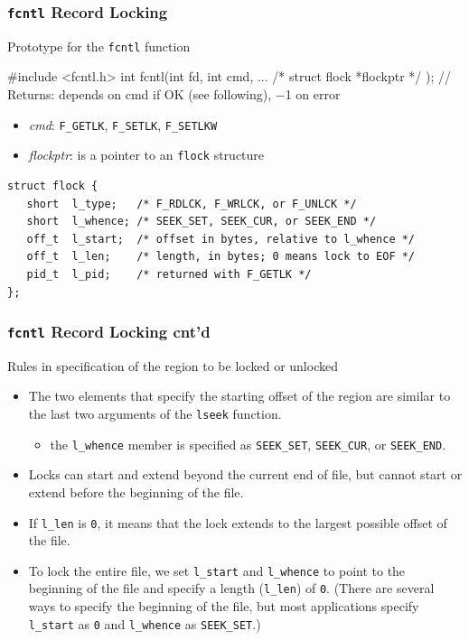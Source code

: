 \documentclass[newPxFont,sthlmFooter,nooffset]{beamer}
\begin{document}
\begin{frame}[fragile,t]
  \frametitle{\texttt{fcntl} Record Locking}

Prototype for the \texttt{fcntl} function
\begin{codedef}
#include <fcntl.h>
int fcntl(int fd, int cmd, ... /* struct flock *flockptr */ );
// Returns: depends on cmd if OK (see following), −1 on error
\end{codedef}

\begin{itemize}
\item \textit{cmd}: \texttt{F\_GETLK}, \texttt{F\_SETLK}, \texttt{F\_SETLKW}
\item \textit{flockptr}: is a pointer to an \texttt{flock} structure
\end{itemize}

{\footnotesize
\begin{verbatim}
struct flock {
   short  l_type;   /* F_RDLCK, F_WRLCK, or F_UNLCK */
   short  l_whence; /* SEEK_SET, SEEK_CUR, or SEEK_END */
   off_t  l_start;  /* offset in bytes, relative to l_whence */
   off_t  l_len;    /* length, in bytes; 0 means lock to EOF */
   pid_t  l_pid;    /* returned with F_GETLK */
};
\end{verbatim}
}
\end{frame}

\begin{frame}[t]
  \frametitle{\texttt{fcntl} Record Locking cnt'd}
Rules in specification of the region to be locked or unlocked
\begin{itemize}
\item The two elements that specify the starting offset of the region are similar to the last two arguments of the \texttt{lseek} function.
  \begin{itemize}
  \item the \texttt{l\_whence} member is specified as
    \texttt{SEEK\_SET}, \texttt{SEEK\_CUR}, or \texttt{SEEK\_END}.
  \end{itemize}

\item  Locks can start and extend beyond the current end of file, but cannot start or extend before the beginning of the file.
\item  If \texttt{l\_len} is \texttt{0}, it means that the lock extends to the largest possible offset of the file.
\item To lock the entire file, we set \texttt{l\_start} and \texttt{l\_whence} to point to the beginning of the file and specify a length (\texttt{l\_len}) of \texttt{0}. {\footnotesize (There are several ways to specify the beginning of the file, but most applications specify \texttt{l\_start} as \texttt{0} and \texttt{l\_whence} as \texttt{SEEK\_SET}.)}
\end{itemize}
\end{frame}
\end{document}
